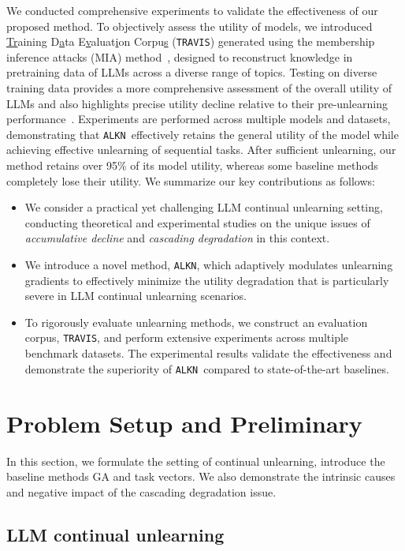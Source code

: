 \documentclass{article}
\theoremstyle{plain}
\theoremstyle{definition}
\theoremstyle{remark}
\newcommand{\method}{\texttt{ALKN}}
\begin{document}
We conducted comprehensive experiments to validate the effectiveness of our proposed method. 
To objectively assess the utility of models, we introduced \underline{Tr}aining D\underline{a}ta E\underline{v}aluat\underline{i}on Corpu\underline{s} (\texttt{TRAVIS}) generated using the membership inference attacks (MIA) method~\cite{DBLP:conf/iclr/ShiAXHLB0Z24}, designed to reconstruct knowledge in pretraining data of LLMs across a diverse range of topics.
Testing on diverse training data provides a more comprehensive assessment of the overall utility of LLMs and also highlights precise utility decline relative to their pre-unlearning performance~\cite{DBLP:journals/corr/abs-2410-02879}.
Experiments are performed across multiple models and datasets, demonstrating that \method~effectively retains the general utility of the model while achieving effective unlearning of sequential tasks.
After sufficient unlearning, our method retains over 95\% of its model utility, whereas some baseline methods completely lose their utility.
We summarize our key contributions as follows:
\begin{itemize}
    \item We consider a practical yet challenging LLM continual unlearning setting, conducting theoretical and experimental studies on the unique issues of \textit{accumulative decline} and \textit{cascading degradation} in this context.
    \item We introduce a novel method, \method, which adaptively modulates unlearning gradients to effectively minimize the utility degradation that is particularly severe in LLM continual unlearning scenarios.
    \item To rigorously evaluate unlearning methods, we construct an evaluation corpus, \texttt{TRAVIS}, and perform extensive experiments across multiple benchmark datasets. The experimental results validate the effectiveness and demonstrate the superiority of \method~compared to state-of-the-art baselines.
\end{itemize}


\section{Problem Setup and Preliminary}
In this section, we formulate the setting of continual unlearning, introduce the baseline methods GA and task vectors. We also demonstrate the intrinsic causes and negative impact of the cascading degradation issue.
\label{sec:preliminary}
\subsection{LLM continual unlearning}
\end{document}

